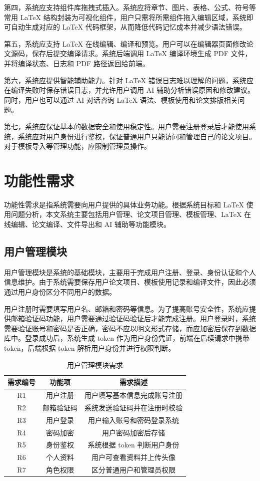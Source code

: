 \documentclass{xduugthesis}
\begin{document}
第四，系统应支持组件库拖拽式插入。系统应将章节、图片、表格、公式、符号等常用 LaTeX 结构封装为可视化组件，用户只需将所需组件拖入编辑区域，系统即可自动生成对应的 LaTeX 代码框架，从而降低代码记忆成本并减少语法错误。

第五，系统应支持 LaTeX 在线编辑、编译和预览。用户可以在编辑器页面修改论文源码，保存后提交编译请求。系统后端调用 LaTeX 编译环境生成 PDF 文件，并将编译状态、日志和 PDF 路径返回给前端。

第六，系统应提供智能辅助能力。针对 LaTeX 错误日志难以理解的问题，系统应在编译失败时保存错误日志，并允许用户调用 AI 辅助分析错误原因和修改建议。同时，用户也可以通过 AI 对话咨询 LaTeX 语法、模板使用和论文排版相关问题。

第七，系统应保证基本的数据安全和使用稳定性。用户需要注册登录后才能使用系统，系统应对用户身份进行鉴权，保证普通用户只能访问和管理自己的论文项目。对于模板导入等管理功能，应限制管理员操作。

\section{功能性需求}
功能性需求是指系统需要向用户提供的具体业务功能。根据系统目标和 LaTeX 使用问题分析，本文系统主要包括用户管理、论文项目管理、模板管理、LaTeX 在线编辑、论文编译、文件导出和 AI 辅助等功能模块。

\subsection{用户管理模块}
用户管理模块是系统的基础模块，主要用于完成用户注册、登录、身份认证和个人信息维护。由于系统需要保存用户论文项目、模板使用记录和编译文件，因此必须通过用户身份区分不同用户的数据。

用户注册时需要填写用户名、邮箱和密码等信息。为了提高账号安全性，系统应提供邮箱验证码功能，用户需要通过验证码验证后才能完成注册。用户登录时，系统需要验证账号和密码是否正确，密码不应以明文形式存储，而应加密后保存到数据库中。登录成功后，系统生成 token 作为用户身份凭证，前端在后续请求中携带 token，后端根据 token 解析用户身份并进行权限判断。

\begin{table}[!ht]
    \centering
    \caption{用户管理模块需求}
    \label{tab:user-requirement}
    \begin{tabular}{|c|c|c|}
        \hline
        需求编号 & 功能项 & 需求描述 \\
        \hline
        R1 & 用户注册 & 用户填写基本信息完成账号注册 \\
        \hline
        R2 & 邮箱验证码 & 系统发送验证码并在注册时校验 \\
        \hline
        R3 & 用户登录 & 用户输入账号和密码登录系统 \\
        \hline
        R4 & 密码加密 & 用户密码加密后存储 \\
        \hline
        R5 & 身份鉴权 & 系统根据 token 判断用户身份 \\
        \hline
        R6 & 个人资料 & 用户可查看资料并上传头像 \\
        \hline
        R7 & 角色权限 & 区分普通用户和管理员权限 \\
        \hline
    \end{tabular}
\end{table}
\end{document}
